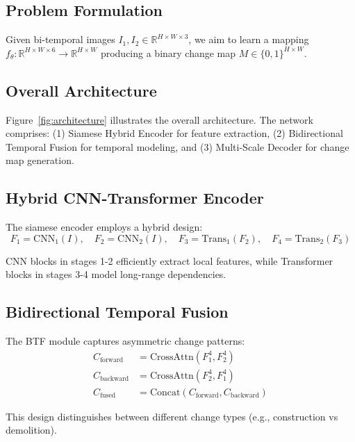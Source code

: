 \documentclass{IEEEtran}
\begin{document}
\subsection{Problem Formulation}

Given bi-temporal images $I_1, I_2 \in \mathbb{R}^{H \times W \times 3}$, we aim to learn a mapping $f_\theta: \mathbb{R}^{H \times W \times 6} \rightarrow \mathbb{R}^{H \times W}$ producing a binary change map $M \in \{0, 1\}^{H \times W}$.

\subsection{Overall Architecture}

Figure~\ref{fig:architecture} illustrates the overall architecture. The network comprises: (1) Siamese Hybrid Encoder for feature extraction, (2) Bidirectional Temporal Fusion for temporal modeling, and (3) Multi-Scale Decoder for change map generation.

\subsection{Hybrid CNN-Transformer Encoder}

The siamese encoder employs a hybrid design:
\begin{equation}
F_1 = \text{CNN}_1(I), \quad F_2 = \text{CNN}_2(I), \quad F_3 = \text{Trans}_1(F_2), \quad F_4 = \text{Trans}_2(F_3)
\end{equation}

CNN blocks in stages 1-2 efficiently extract local features, while Transformer blocks in stages 3-4 model long-range dependencies.

\subsection{Bidirectional Temporal Fusion}

The BTF module captures asymmetric change patterns:
\begin{align}
C_{\text{forward}} &= \text{CrossAttn}(F_1^4, F_2^4) \\
C_{\text{backward}} &= \text{CrossAttn}(F_2^4, F_1^4) \\
C_{\text{fused}} &= \text{Concat}(C_{\text{forward}}, C_{\text{backward}})
\end{align}

This design distinguishes between different change types (e.g., construction vs demolition).
\end{document}
